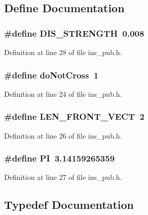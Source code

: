 \subsection{Define Documentation}
\subsubsection[{DIS\_\-STRENGTH}]{\setlength{\rightskip}{0pt plus 5cm}\#define DIS\_\-STRENGTH~0.008}\label{ins__pub_8h_abedab1b196d80411e1ed102f2a367ccd}


Definition at line 28 of file ins\_\-pub.h.

\subsubsection[{doNotCross}]{\setlength{\rightskip}{0pt plus 5cm}\#define doNotCross~1}\label{ins__pub_8h_a1f597718bbb741b6773d45c36555b214}


Definition at line 24 of file ins\_\-pub.h.

\subsubsection[{LEN\_\-FRONT\_\-VECT}]{\setlength{\rightskip}{0pt plus 5cm}\#define LEN\_\-FRONT\_\-VECT~2}\label{ins__pub_8h_afa7a11fe6808d6f2d83b138660cfe938}


Definition at line 26 of file ins\_\-pub.h.

\subsubsection[{PI}]{\setlength{\rightskip}{0pt plus 5cm}\#define PI~3.14159265359}\label{ins__pub_8h_a598a3330b3c21701223ee0ca14316eca}


Definition at line 27 of file ins\_\-pub.h.



\subsection{Typedef Documentation}

